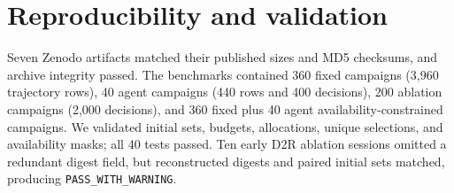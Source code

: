 \documentclass{article}
\begin{document}
\section{Reproducibility and validation}

Seven Zenodo artifacts matched their published sizes and MD5 checksums, and archive integrity passed. The benchmarks contained 360 fixed campaigns (3,960 trajectory rows), 40 agent campaigns (440 rows and 400 decisions), 200 ablation campaigns (2,000 decisions), and 360 fixed plus 40 agent availability-constrained campaigns. We validated initial sets, budgets, allocations, unique selections, and availability masks; all 40 tests passed. Ten early D2R ablation sessions omitted a redundant digest field, but reconstructed digests and paired initial sets matched, producing \texttt{PASS\_WITH\_WARNING}.

\clearpage


\end{document}
